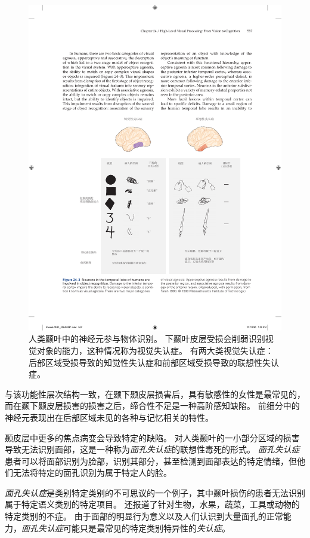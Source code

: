 \begin{figure}[htbp]
	\centering
	\includegraphics[width=0.95\linewidth]{chap24/fig_24_3}
	\caption{人类颞叶中的神经元参与物体识别。
		下颞叶皮层受损会削弱识别视觉对象的能力，这种情况称为视觉失认症。 
		有两大类视觉失认症：后部区域受损导致的知觉性失认症和前部区域受损导致的联想性失认症。}
	\label{fig:24_3}
\end{figure}


与该功能性层次结构一致，在颞下颞皮层损害后，具有敏感性的女性是最常见的，而在颞下颞皮层损害的损害之后，缔合性不足是一种高阶感知缺陷。
前细分中的神经元表现出在后部区域未见的各种与记忆相关的特性。


颞皮层中更多的焦点病变会导致特定的缺陷。
对人类颞叶的一小部分区域的损害导致无法识别面部，这是一种称为\textit{面孔失认症}的联想性毒死的形式。
\textit{面孔失认症}患者可以将面部识别为脸部，识别其部分，甚至检测到面部表达的特定情绪，但他们无法将特定的面孔识别为属于特定人的脸。


\textit{面孔失认症}是类别特定类别的不可思议的一个例子，其中颞叶损伤的患者无法识别属于特定语义类别的特定项目。
还报道了针对生物，水果，蔬菜，工具或动物的特定类别的不症。
由于面部的明显行为意义以及人们认识到大量面孔的正常能力，\textit{面孔失认症}可能只是最常见的特定类别特异性的\textit{失认症}。



